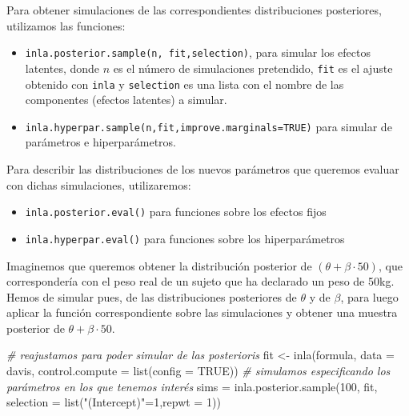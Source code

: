 \documentclass[
]{book}
\newenvironment{Shaded}{\begin{snugshade}}{\end{snugshade}}
\newcommand{\AttributeTok}[1]{\textcolor[rgb]{0.77,0.63,0.00}{#1}}
\newcommand{\CommentTok}[1]{\textcolor[rgb]{0.56,0.35,0.01}{\textit{#1}}}
\newcommand{\ConstantTok}[1]{\textcolor[rgb]{0.00,0.00,0.00}{#1}}
\newcommand{\DecValTok}[1]{\textcolor[rgb]{0.00,0.00,0.81}{#1}}
\newcommand{\FunctionTok}[1]{\textcolor[rgb]{0.00,0.00,0.00}{#1}}
\newcommand{\NormalTok}[1]{#1}
\newcommand{\OtherTok}[1]{\textcolor[rgb]{0.56,0.35,0.01}{#1}}
\newcommand{\StringTok}[1]{\textcolor[rgb]{0.31,0.60,0.02}{#1}}
\providecommand{\tightlist}{%
  \setlength{\itemsep}{0pt}\setlength{\parskip}{0pt}}
\begin{document}
Para obtener simulaciones de las correspondientes distribuciones posteriores, utilizamos las funciones:

\begin{itemize}
\tightlist
\item
  \texttt{inla.posterior.sample(n,\ fit,selection)}, para simular los efectos latentes, donde \(n\) es el número de simulaciones pretendido, \texttt{fit} es el ajuste obtenido con \texttt{inla} y \texttt{selection} es una lista con el nombre de las componentes (efectos latentes) a simular.\\
\item
  \texttt{inla.hyperpar.sample(n,fit,improve.marginals=TRUE)} para simular de parámetros e hiperparámetros.
\end{itemize}

Para describir las distribuciones de los nuevos parámetros que queremos evaluar con dichas simulaciones, utilizaremos:

\begin{itemize}
\tightlist
\item
  \texttt{inla.posterior.eval()} para funciones sobre los efectos fijos
\item
  \texttt{inla.hyperpar.eval()} para funciones sobre los hiperparámetros
\end{itemize}

Imaginemos que queremos obtener la distribución posterior de \((\theta+\beta \cdot 50)\), que correspondería con el peso real de un sujeto que ha declarado un peso de 50kg. Hemos de simular pues, de las distribuciones posteriores de \(\theta\) y de \(\beta\), para luego aplicar la función correspondiente sobre las simulaciones y obtener una muestra posterior de \(\theta+\beta\cdot 50\).

\begin{Shaded}
\begin{Highlighting}[]
\CommentTok{\# reajustamos para poder simular de las posterioris}
\NormalTok{fit }\OtherTok{\textless{}{-}} \FunctionTok{inla}\NormalTok{(formula, }\AttributeTok{data =}\NormalTok{ davis,}
  \AttributeTok{control.compute =} \FunctionTok{list}\NormalTok{(}\AttributeTok{config =} \ConstantTok{TRUE}\NormalTok{))}
\CommentTok{\# simulamos especificando los parámetros en los que tenemos interés}
\NormalTok{sims }\OtherTok{=} \FunctionTok{inla.posterior.sample}\NormalTok{(}\DecValTok{100}\NormalTok{, fit, }\AttributeTok{selection =} \FunctionTok{list}\NormalTok{(}\StringTok{"(Intercept)"}\OtherTok{=}\DecValTok{1}\NormalTok{,}\AttributeTok{repwt =} \DecValTok{1}\NormalTok{))}
\end{Highlighting}
\end{Shaded}
\end{document}
